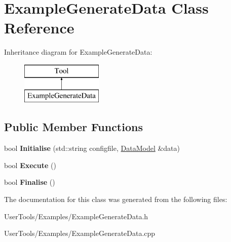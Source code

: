 \hypertarget{classExampleGenerateData}{\section{Example\-Generate\-Data Class Reference}
\label{classExampleGenerateData}
}
Inheritance diagram for Example\-Generate\-Data\-:\begin{figure}[H]
\begin{center}
\leavevmode
\includegraphics[height=2.000000cm]{classExampleGenerateData}
\end{center}
\end{figure}
\subsection*{Public Member Functions}
\begin{DoxyCompactItemize}
\item 
\hypertarget{classExampleGenerateData_a34ef11ea9d2fe02c76c13227855538c7}{bool {\bfseries Initialise} (std\-::string configfile, \hyperlink{classDataModel}{Data\-Model} \&data)}\label{classExampleGenerateData_a34ef11ea9d2fe02c76c13227855538c7}

\item 
\hypertarget{classExampleGenerateData_a8ad50d91b736d2f11f48db3179ac7019}{bool {\bfseries Execute} ()}\label{classExampleGenerateData_a8ad50d91b736d2f11f48db3179ac7019}

\item 
\hypertarget{classExampleGenerateData_a7d27959b6641603076134866022f5ee9}{bool {\bfseries Finalise} ()}\label{classExampleGenerateData_a7d27959b6641603076134866022f5ee9}

\end{DoxyCompactItemize}


The documentation for this class was generated from the following files\-:\begin{DoxyCompactItemize}
\item 
User\-Tools/\-Examples/Example\-Generate\-Data.\-h\item 
User\-Tools/\-Examples/Example\-Generate\-Data.\-cpp\end{DoxyCompactItemize}
